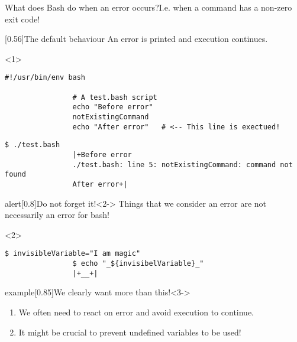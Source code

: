 \begin{frame}[fragile]{What does Bash do when an error occurs?}{I.e. when a command has a non-zero exit code!}
    \vspace{-3mm}
    \begin{overlayarea}{\textwidth}{0.7\textheight}
        \begin{varblock}{}[0.56\textwidth]{The default behaviour}
            An error is printed and \alert{execution continues}.
        \end{varblock}
        \begin{onlyenv}<1>
            \begin{lstlisting}[style=myBash, numberblanklines=true, countblanklines=true, aboveskip=5mm]
                #!/usr/bin/env bash

                # A test.bash script
                echo "Before error"
                notExistingCommand
                echo "After error"   # <-- This line is exectued!
            \end{lstlisting}
            \begin{lstlisting}[style=myBash, numbers=none, aboveskip=2mm]
                $ ./test.bash
                |+Before error
                ./test.bash: line 5: notExistingCommand: command not found
                After error+|
            \end{lstlisting}
        \end{onlyenv}
        \begin{varblock}{alert}[0.8\textwidth]{Do not forget it!}<2->
            Things that we consider an error are not necessarily an error for bash!
        \end{varblock}
        \begin{onlyenv}<2>
            \begin{lstlisting}[style=myBash, numbers=none, aboveskip=5mm]
                $ invisibleVariable="I am magic"
                $ echo "_${invisibelVariable}_"
                |+__+|
            \end{lstlisting}
        \end{onlyenv}
        \begin{varblock}{example}[0.85\textwidth]{We clearly want more than this!}<3->
            \begin{enumerate}
                \item We often need to react on error and avoid execution to continue.
                \item It might be crucial to prevent undefined variables to be used!

\end{enumerate}
\end{varblock}
\end{overlayarea}
\end{frame}
